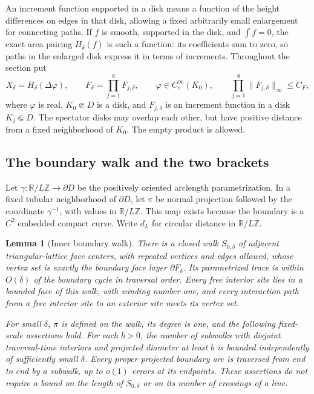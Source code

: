 \documentclass[11pt]{article}
\newtheorem{lemma}[theorem]{Lemma}
\theoremstyle{definition}
\theoremstyle{remark}
\numberwithin{equation}{section}
\begin{document}
An increment function supported in a disk means a function of the height
differences on edges in that disk, allowing a fixed arbitrarily small
enlargement for connecting paths.  If $f$ is smooth, supported in the disk,
and $\int f=0$, the exact area pairing $H_\delta(f)$ is such a function:
its coefficients sum to zero, so paths in the enlarged disk express it
in terms of increments.  Throughout the section put
\begin{equation}\label{pins:insertion-data}
 X_\delta=H_\delta(\Delta\varphi),\qquad
 F_\delta=\prod_{j=1}^q F_{j,\delta},\qquad
 \varphi\in C_c^\infty(K_0),\qquad
 \prod_{j=1}^q\|F_{j,\delta}\|_\infty\le C_F,
\end{equation}
where $\varphi$ is real, $K_0\Subset D$ is a disk, and $F_{j,\delta}$ is
an increment function in a disk $K_j\Subset D$.  The spectator disks may
overlap each other, but have positive distance from a fixed neighborhood
of $K_0$.  The empty product is allowed.

\subsection{The boundary walk and the two brackets}

Let $\gamma:\mathbb R/L\mathbb Z\longrightarrow\partial D$ be the positively oriented
arclength parametrization.  In a fixed tubular neighborhood of
$\partial D$, let $\pi$ be normal projection followed by the coordinate
$\gamma^{-1}$, with values in $\mathbb R/L\mathbb Z$.  This map exists because the
boundary is a $C^2$ embedded compact curve.  Write $d_L$ for circular
distance in $\mathbb R/L\mathbb Z$.

\begin{lemma}[Inner boundary walk]\label{lem:boundary-walk}
There is a closed walk $S_{0,\delta}$ of adjacent triangular-lattice face
centers, with repeated vertices and edges allowed, whose vertex set is
exactly the boundary face layer $\partial F_\delta$.  Its parametrized
trace is within $O(\delta)$ of the boundary cycle in traversal order.
Every free interior site lies in a bounded face of this walk, with
winding number one, and every interaction path from a free interior site
to an exterior site meets its vertex set.

For small $\delta$, $\pi$ is defined on the walk, its degree is one,
and the following fixed-scale assertions hold.  For each $b>0$, the
number of subwalks with disjoint traversal-time interiors and projected
diameter at least $b$ is bounded independently of sufficiently small
$\delta$.  Every proper projected boundary arc is traversed from end
to end by a subwalk, up to $o(1)$ errors at its endpoints.  These
assertions do not require a bound on the length of $S_{0,\delta}$ or
on its number of crossings of a line.
\end{lemma}
\end{document}
